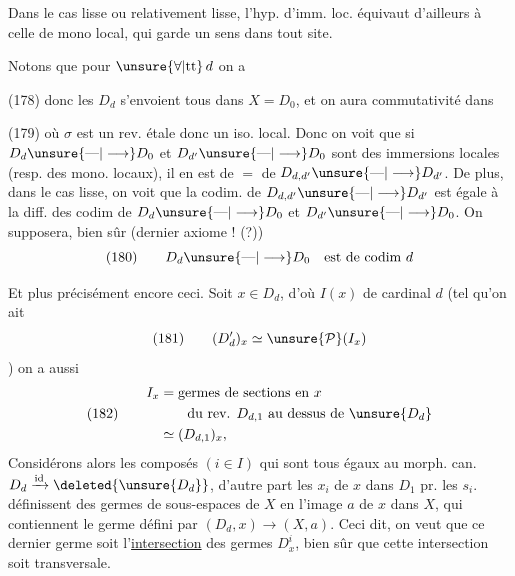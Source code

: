 Dans le cas lisse ou relativement lisse, l'hyp. d'imm. loc. équivaut d'ailleurs à celle de mono local, qui garde un sens dans tout site.

Notons que pour $\unsure{\forall|\mathrm{tt}}\,d$ on a

(178)\quad
{}
donc les $D_d$ s'envoient tous  dans $X=D_0$, et on aura commutativité dans

(179)\quad
{}
où $\sigma$ est un rev. étale donc un iso. local. Donc on voit que si $D_d\unsure{\text{---}|\longrightarrow}D_0$ et $D_{d'}\unsure{\text{---}|\longrightarrow}D_0$ sont des immersions locales (resp. des mono. locaux), il en est de $=$ de $D_{d,d'}\unsure{\text{---}|\longrightarrow}D_{d'}$. De plus, dans le cas lisse, on voit que la codim. de $D_{d,d'}\unsure{\text{---}|\longrightarrow}D_{d'}$ est égale à la diff. des codim de $D_d\unsure{\text{---}|\longrightarrow}D_0$ et $D_{d'}\unsure{\text{---}|\longrightarrow}D_0$. On supposera, bien sûr (dernier axiome ! (?))
\[
(180)\qquad D_d\unsure{\text{---}|\longrightarrow}D_0\quad\text{est de codim }d
\]

 Et plus précisément encore ceci. Soit  $x\in D_d$, d'où $I(x)$ de cardinal $d$ (tel qu'on ait
\[
(181)\qquad(D'_d)_x\simeq\unsure{\mathcal P}(I_x)
\]
)
  on a aussi
\[
(182)\qquad\begin{aligned}
I_x&=\text{germes de sections en }x\\
&\qquad\text{du rev. }D_{d,1}\text{ au dessus de }\unsure{D_d}\\
&\simeq(D_{d,1})_x,
\end{aligned}
\]
Considérons alors les composés $(i\in I)$
qui sont tous égaux au morph. can. $D_d\xrightarrow{\mathrm{id}}\deleted{\unsure{D_d}}$, d'autre part les  $x_i$ de $x$ dans $D_1$ pr. les $s_i$.
définissent des germes de sous-espaces  de $X$ en l'image $a$ de $x$ dans $X$, qui contiennent le germe défini par $(D_d,x)\longrightarrow(X,a)$. Ceci dit, on veut que ce dernier germe soit l'\uline{intersection} des germes $D_x^i$,   bien sûr que cette intersection soit transversale.

